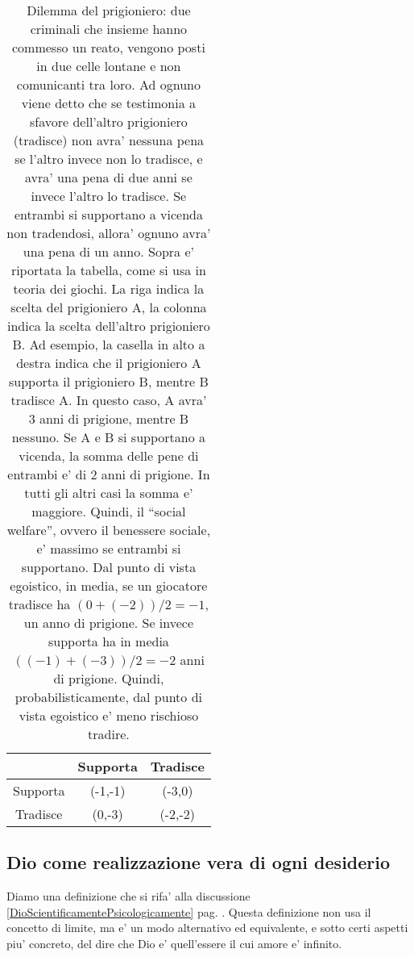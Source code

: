 \begin{center}
    \begin{table}
        \begin{tabular}{ |c|c|c| }
            \hline
            &  Supporta   &   Tradisce \\
            \hline
            Supporta   & (-1,-1) & (-3,0) \\
            \hline
            Tradisce & (0,-3) & (-2,-2) \\
            \hline
        \end{tabular}
        \caption{\label{tabPrisonerDilemma}Dilemma del prigioniero: due criminali che insieme hanno commesso un reato, vengono posti in due celle lontane e non comunicanti tra loro. Ad ognuno viene detto che se testimonia a sfavore dell'altro prigioniero (tradisce) non avra' nessuna pena se l'altro invece non lo tradisce, e avra' una pena di due anni se invece l'altro lo tradisce. Se entrambi si supportano a vicenda non tradendosi, allora' ognuno avra' una pena di un anno. Sopra e' riportata la tabella, come si usa in teoria dei giochi. La riga indica la scelta del prigioniero A, la colonna indica la scelta dell'altro prigioniero B. Ad esempio, la casella in alto a destra indica che il prigioniero A supporta il prigioniero B, mentre B tradisce A. In questo caso, A avra' 3 anni di prigione, mentre B nessuno. Se A e B si supportano a vicenda, la somma delle pene di entrambi e' di 2 anni di prigione. In tutti gli altri casi la somma e' maggiore. Quindi, il ``social welfare'', ovvero il benessere sociale, e' massimo se entrambi si supportano. Dal punto di vista egoistico, in media, se un giocatore tradisce ha $(0+(-2))/2 = -1$, un anno di prigione. Se invece supporta ha in media $((-1)+(-3))/2=-2$ anni di prigione. Quindi, probabilisticamente, dal punto di vista egoistico e' meno rischioso tradire. }

    \end{table}
\end{center}

\pagebreak

\subsection{Dio come realizzazione vera di ogni desiderio}
\label{FormulazionePuntualeDiDio}

Diamo una definizione che si rifa' alla discussione \ref{DioScientificamentePsicologicamente} pag. \pageref{DioScientificamentePsicologicamente}. Questa definizione non usa il concetto di limite, ma e' un modo alternativo ed equivalente, e sotto certi aspetti piu' concreto, del dire che Dio e' quell'essere il cui amore e' infinito.

